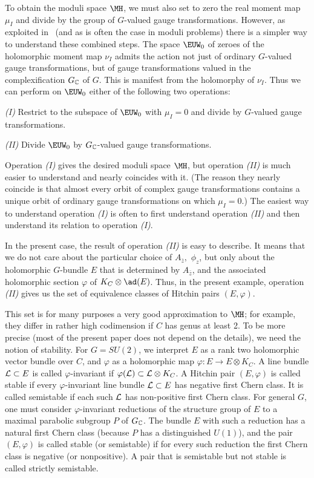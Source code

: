 To obtain the moduli space $\MH$, we must also set to zero the
real moment map $\mu_I$ and divide by the group of $G$-valued
gauge transformations.  However, as exploited in \cite{ref20}\ (and as
is often the case in moduli problems) there is a simpler way to
understand these combined steps.  The space $\EUW_0$ of zeroes of
the holomorphic moment map $\nu_I$ admits the action not just of
ordinary $G$-valued gauge transformations, but of gauge
transformations valued in the complexification $G_{\Bbb{C}}$ of
$G$.  This is manifest from the holomorphy of $\nu_I$. Thus  we
can perform on $\EUW_0$ either of the following two operations:

{\it (I)} Restrict to the subspace of $\EUW_0$ with $\mu_I=0$ and
divide by $G$-valued gauge transformations.

 {\it (II)} Divide $\EUW_0$ by $G_{\Bbb{C}}$-valued gauge
transformations.

 Operation {\it (I)} gives the desired moduli space
$\MH$, but operation {\it (II)} is much easier to understand and
nearly coincides with it.  (The reason they nearly coincide is
that almost every orbit of complex gauge transformations contains
a unique orbit of ordinary gauge transformations on which
$\mu_I=0$.)  The easiest way to understand operation {\it (I)} is
often to first understand operation {\it (II)} and then understand
its relation to operation {\it (I)}.

In the present case, the result of operation {\it (II)} is easy to
describe. It means that we do not care about the particular choice
of $A_{\bar z}, $ $\phi_z$, but only about the holomorphic
$G$-bundle $E$ that is determined by $A_{\bar z}$, and the
associated holomorphic section $\varphi$ of $K_C\otimes {\ad}(E)$.
Thus, in the present example, operation {\it (II)} gives us the
set of equivalence classes of Hitchin pairs $(E,\varphi)$.

This set is for many purposes a very good approximation to $\MH$;
for example, they differ in rather  high codimension if $C$ has
genus at least 2. To be more precise (most of the present paper
does not depend on the details),  we need the notion of stability.
For $G=SU(2)$, we interpret $E$ as a rank two holomorphic vector
bundle over $C$, and $\varphi$ as a holomorphic map $\varphi:E\to
E\otimes K_C$. A line bundle ${\cal L}\subset E$ is called
$\varphi$-invariant if $\varphi({\cal L})\subset {\cal L}\otimes
K_C$. A Hitchin pair $(E,\varphi)$ is called stable if every
$\varphi$-invariant line bundle ${\cal L}\subset E$ has negative
first Chern class. It is called semistable if each such ${\cal L}$
has non-positive first Chern class. For general $G$, one must
consider $\varphi$-invariant reductions of the structure group of
$E$ to a maximal parabolic subgroup $P$ of $G_{\Bbb{C}}$. The
bundle $E$ with such a reduction has a natural first Chern class
(because $P$ has a distinguished $U(1)$), and the pair
$(E,\varphi)$ is called stable (or semistable) if for every such
reduction the first Chern class is negative (or nonpositive). A
pair that is semistable but not stable is called strictly
semistable.

